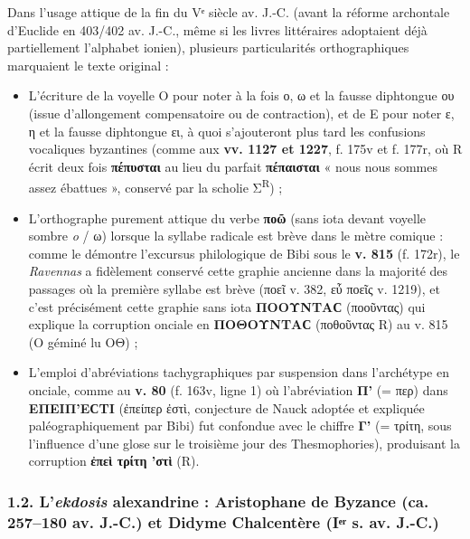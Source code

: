 \documentclass[11pt, a4paper, twoside]{article}
\renewcommand{\_}{\origunderscore\penalty0\relax}
\renewcommand{\texttt}[1]{#1}
\newcommand{\R}{\textbf{R}}
\newcommand{\Bibi}{\textit{Bibi}}
\def\R{R}%
\def\Bibi{Bibi}%
\begin{document}
Dans l'usage attique de la fin du Vᵉ siècle av. J.-C. (avant la réforme archontale d'Euclide en 403/402 av. J.-C., même si les livres littéraires adoptaient déjà partiellement l'alphabet ionien), plusieurs particularités orthographiques marquaient le texte original :
\begin{itemize}[leftmargin=1.5em, itemsep=2pt]
  \item L'écriture de la voyelle \texttt{Ο} pour noter à la fois ο, ω et la fausse diphtongue ου (issue d'allongement compensatoire ou de contraction), et de \texttt{Ε} pour noter ε, η et la fausse diphtongue ει, à quoi s'ajouteront plus tard les confusions vocaliques byzantines (comme aux \textbf{vv. 1127 et 1227}, \texttt{f. 175v} et \texttt{f. 177r}, où \R{} écrit deux fois \textbf{\texttt{πέπυσται}} au lieu du parfait \textbf{\texttt{πέπαισται}} « nous nous sommes assez ébattues », conservé par la scholie Σ\textsuperscript{R}) ;
  \item L'orthographe purement attique du verbe \textbf{\texttt{ποῶ}} (sans iota devant voyelle sombre \textit{o} / ω) lorsque la syllabe radicale est brève dans le mètre comique : comme le démontre l'excursus philologique de \Bibi{} sous le \textbf{v. 815} (\texttt{f. 172r}), le \textit{Ravennas} a fidèlement conservé cette graphie ancienne dans la majorité des passages où la première syllabe est brève (\texttt{ποεῖ} v. 382, \texttt{εὖ ποεῖς} v. 1219), et c'est précisément cette graphie sans iota \textbf{\texttt{ΠΟΟΥΝΤΑϹ}} (\texttt{ποοῦντας}) qui explique la corruption onciale en \textbf{\texttt{ΠΟΘΟΥΝΤΑϹ}} (\texttt{ποθοῦντας} \R{}) au v. 815 (\texttt{O} géminé lu \texttt{ΟΘ}) ;
  \item L'emploi d'abréviations tachygraphiques par suspension dans l'archétype en onciale, comme au \textbf{v. 80} (\texttt{f. 163v}, ligne 1) où l'abréviation \textbf{\texttt{Π'}} (\texttt{= περ}) dans \textbf{\texttt{ΕΠΕΙΠ'ΕϹΤΙ}} (\texttt{ἐπείπερ ἐστὶ}, conjecture de Nauck adoptée et expliquée paléographiquement par \Bibi{}) fut confondue avec le chiffre \textbf{\texttt{Γ'}} (\texttt{= τρίτη}, sous l'influence d'une glose sur le troisième jour des Thesmophories), produisant la corruption \textbf{\texttt{ἐπεὶ τρίτη 'στὶ}} (\R{}).
\end{itemize}


\subsubsection{1.2. L'\textit{ekdosis} alexandrine : Aristophane de Byzance (ca. 257–180 av. J.-C.) et Didyme Chalcentère (Iᵉʳ s. av. J.-C.)}
\end{document}
